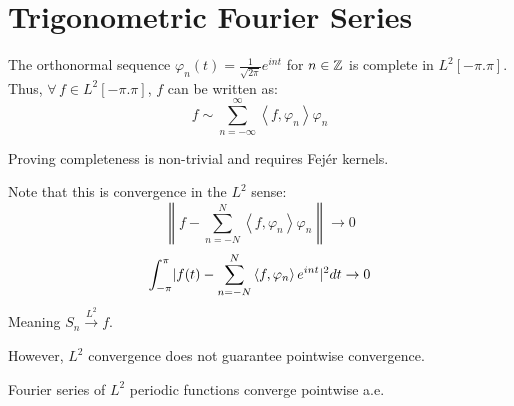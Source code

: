 \documentclass[letterpaper,12pt,fleqn]{article}
\newcommand{\p}{\varphi}
\newcommand{\norm}[1]{\left\|#1\right\|}
\newcommand{\inner}[1]{\left<#1\right>}
\begin{document}
\section*{Trigonometric Fourier Series}

\begin{theorem}
  The orthonormal sequence $\p_n(t)=\frac{1}{\sqrt{2\pi}}e^{int}$ for $n\in\mathbb{Z}$
  is complete in $L^2[-\pi.\pi]$. Thus, $\forall\,f\in L^2[-\pi.\pi]$, $f$ can
  be written as:
  \[f\sim\sum_{n=-\infty}^{\infty}\inner{f,\p_n}\p_n\]
\end{theorem}

Proving completeness is non-trivial and requires Fej\'{e}r kernels.

Note that this is convergence in the $L^2$ sense:
\[\norm{f-\sum_{n=-N}^N\inner{f,\p_n}\p_n}\to0\]
\[\int_{-\pi}^{\pi}\abs{f(t)-\sum_{n=-N}^N\inner{f,\p_n}e^{int}}^2dt\to0\]
Meaning $S_n\overset{L^2}{\to}f$.

However, $L^2$ convergence does not guarantee pointwise convergence.

\begin{theorem}[Carleson]
  Fourier series of $L^2$ periodic functions converge pointwise a.e.
\end{theorem}
\end{document}
